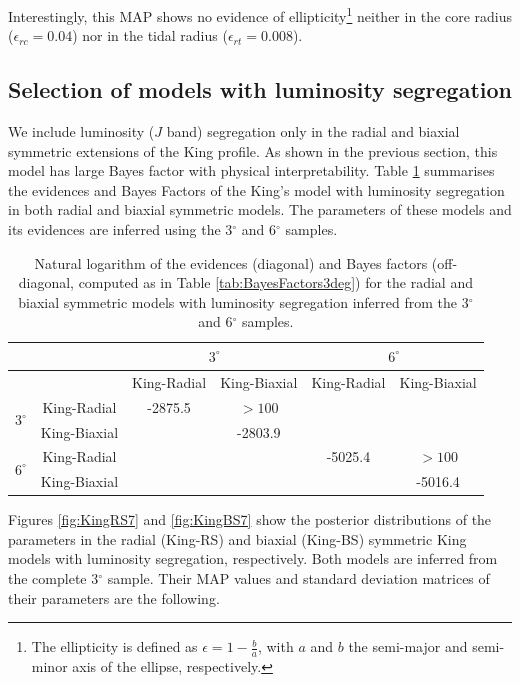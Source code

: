 Interestingly, this MAP shows no evidence of ellipticity\footnote{The ellipticity is defined as $\epsilon = 1 - \frac{b}{a}$, with $a$ and $b$ the semi-major and semi-minor axis of the ellipse, respectively.} neither in the core radius ($\epsilon_{rc}= 0.04$) nor in the tidal radius ($\epsilon_{rt}= 0.008$).

\subsection{Selection of models with luminosity segregation}
We include luminosity ($J$ band) segregation only in the radial and biaxial symmetric extensions of the King profile. As shown in the previous section, this model has large Bayes factor with physical interpretability. Table \ref{tab:BayesFactorsLumSeg} summarises the evidences and Bayes Factors of the King's model with luminosity segregation in both radial and biaxial symmetric models. The parameters of these models and its evidences are inferred using  the  3$^\circ$ and 6$^\circ$ samples.

\begin{table}[H]
  \centering
  \caption[]{Natural logarithm of the evidences (diagonal) and Bayes factors (off-diagonal, computed as in Table \ref{tab:BayesFactors3deg}) for the radial and biaxial symmetric models with luminosity segregation inferred from the 3$^\circ$ and 6$^\circ$ samples. }
  \label{tab:BayesFactorsLumSeg}
\begin{tabular}{cc|cc|cc}
\hline              
\hline              
&&  \multicolumn{2}{c}{$3^{\circ}$} &   \multicolumn{2}{c}{$6^{\circ}$} \\
\hline              
& & King-Radial& King-Biaxial &  King-Radial &  King-Biaxial \\
\hline              
\multirow{2}{*}{$3^{\circ}$}&King-Radial    &  -2875.5   &    $>100$       &           &            \\
&King-Biaxial &            &  -2803.9  &           &            \\
\hline
\multirow{2}{*}{$6^{\circ}$}& King-Radial    &            &           &   -5025.4 &    $>100$        \\
&King-Biaxial &&                     &           &  -5016.4   \\
\hline              
         \end{tabular}
   \end{table}

Figures \ref{fig:KingRS7} and \ref{fig:KingBS7} show the posterior distributions of the parameters in the radial (King-RS) and biaxial (King-BS) symmetric King models with luminosity segregation, respectively. Both models are inferred from the complete 3$^{\circ}$ sample. Their MAP values and standard deviation matrices of their parameters are the following. 

